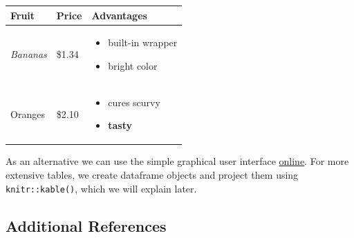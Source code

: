 \documentclass[]{book}
\providecommand{\tightlist}{%
  \setlength{\itemsep}{0pt}\setlength{\parskip}{0pt}}
\theoremstyle{definition}
\theoremstyle{definition}
\theoremstyle{remark}
\begin{document}
\begin{longtable}[]{@{}lll@{}}
\toprule
\begin{minipage}[b]{0.20\columnwidth}\raggedright\strut
Fruit\strut
\end{minipage} & \begin{minipage}[b]{0.20\columnwidth}\raggedright\strut
Price\strut
\end{minipage} & \begin{minipage}[b]{0.27\columnwidth}\raggedright\strut
Advantages\strut
\end{minipage}\tabularnewline
\midrule
\endhead
\begin{minipage}[t]{0.20\columnwidth}\raggedright\strut
\emph{Bananas}\strut
\end{minipage} & \begin{minipage}[t]{0.20\columnwidth}\raggedright\strut
\$1.34\strut
\end{minipage} & \begin{minipage}[t]{0.27\columnwidth}\raggedright\strut
\begin{itemize}
\tightlist
\item
  built-in wrapper
\item
  bright color
\end{itemize}\strut
\end{minipage}\tabularnewline
\begin{minipage}[t]{0.20\columnwidth}\raggedright\strut
Oranges\strut
\end{minipage} & \begin{minipage}[t]{0.20\columnwidth}\raggedright\strut
\$2.10\strut
\end{minipage} & \begin{minipage}[t]{0.27\columnwidth}\raggedright\strut
\begin{itemize}
\tightlist
\item
  cures scurvy
\item
  \textbf{tasty}
\end{itemize}\strut
\end{minipage}\tabularnewline
\bottomrule
\end{longtable}

As an alternative we can use the simple graphical user interface
\href{http://www.tablesgenerator.com/markdown_tables}{online}. For more
extensive tables, we create dataframe objects and project them using
\texttt{knitr::kable()}, which we will explain later.

\subsection{Additional References}\label{additional-references-1}
\end{document}
